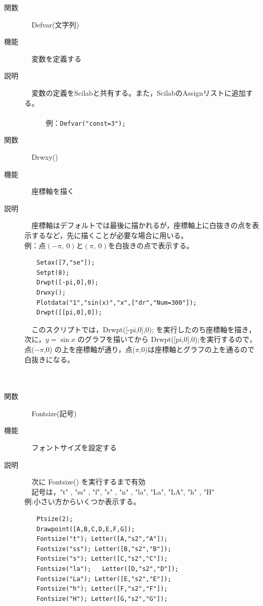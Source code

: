 \documentclass[papersize,a4paper,12pt,uplatex]{jsarticle}
\begin{document}
\begin{description}
\hypertarget{defvar}{}
\item[関数]　Defvar(文字列)
\item[機能]　変数を定義する
\item[説明]　変数の定義をScilabと共有する。また，ScilabのAssignリストに追加する。\\
　\\
　　　例：\verb|Defvar("const=3");|
　\\
\hypertarget{drwxy}{}
\item[関数]　Drwxy()
\item[機能]　座標軸を描く
\item[説明]　座標軸はデフォルトでは最後に描かれるが，座標軸上に白抜きの点を表示するなど，先に描くことが必要な場合に用いる。\\

例：点$(-\pi,\ 0)$と$(\pi,\ 0)$を白抜きの点で表示する。
\begin{verbatim}
　　Setax([7,"se"]);
　　Setpt(8);
　　Drwpt([-pi,0],0);
　　Drwxy();
　　Plotdata("1","sin(x)","x",["dr","Num=300"]);
　　Drwpt([[pi,0],0]);
\end{verbatim}

　このスクリプトでは，Drwpt([-pi,0],0); を実行したのち座標軸を描き，次に，$y=\sin x$ のグラフを描いてから Drwpt([pi,0],0);を実行するので，点($-\pi$,0) の上を座標軸が通り，点($\pi$,0)は座標軸とグラフの上を通るので白抜きになる。\\


　\\
　\\
\hypertarget{fontsize}{}
\item[関数]　Fontsize(記号)
\item[機能]　フォントサイズを設定する
\item[説明]　次に Fontsize() を実行するまで有効\\
　記号は，"t" , "ss" , "f", "s" , "n" , "la",  "La", "LA", "h" , "H"\\

例:小さい方からいくつか表示する。
\begin{verbatim}
　　Ptsize(2);
　　Drawpoint([A,B,C,D,E,F,G]);
　　Fontsize("t"); Letter([A,"s2","A"]);
　　Fontsize("ss"); Letter([B,"s2","B"]);
　　Fontsize("s"); Letter([C,"s2","C"]);
　　Fontsize("la"); 	Letter([D,"s2","D"]);
　　Fontsize("La"); Letter([E,"s2","E"]);
　　Fontsize("h"); Letter([F,"s2","F"]);
　　Fontsize("H"); Letter([G,"s2","G"]);
\end{verbatim}
　　


\end{description}
\end{document}
